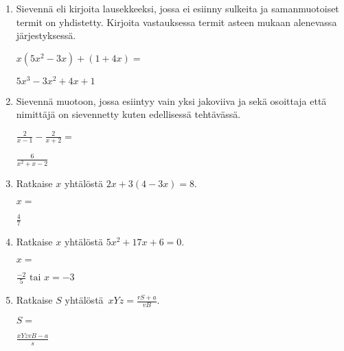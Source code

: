 \documentclass[finnish, a4paper, 12pt]{article}
\begin{document}
\begin{enumerate}[leftmargin=*]
		\vspace{8pt}
		
		\item %
		Sievennä eli kirjoita lausekkeeksi, jossa ei esiinny sulkeita ja 
		samanmuotoiset termit on yhdistetty. 
		Kirjoita vastauksessa termit asteen mukaan alenevassa järjestyksessä. 
		
		\(
		\displaystyle
		x(5x^2 - 3x) + (1 + 4x) = 
		\) %
		\begin{version:withAnswers}
		\( 5x^3 -3x^2 +4x +1 \)
		\end{version:withAnswers}
		
		\vspace{8pt}
		
		\item %
		Sievennä %
		muotoon, jossa esiintyy vain yksi jakoviiva ja sekä osoittaja
		että nimittäjä on sievennetty kuten edellisessä tehtävässä.
		
		\(
		\displaystyle
		\frac{2}{x-1}- \frac{2}{x + 2} =
		\) %
		\begin{version:withAnswers}
		\( \frac{6}{x^2  + x - 2} \)
		\end{version:withAnswers}
		
		\vspace{8pt}
		
		\item %
		Ratkaise \(x\) yhtälöstä \(2x + 3(4 - 3x) = 8\).
		
		\(
		x = 
		\)	%
		\begin{version:withAnswers}
		 \( \frac{4}{7} \)
		\end{version:withAnswers}
		\vspace{8pt}
		
		\item %
		Ratkaise \(x\) yhtälöstä \(5 x^2  + 17 x + 6= 0\).
		
		\(
		x = 		
		\)	%
		
		\begin{version:withAnswers}
		\(\frac{-2}{5} \text{  tai } x = -3\)
		\end{version:withAnswers}
		\vspace{8pt}
		
		\item %
		Ratkaise \(S\) yhtälöstä 
		\(
		\displaystyle \,
		xYz = \frac{rS+a}{vB} .
		\)	
		
		\(
		S = 
		\) %
		\begin{version:withAnswers}
		\( \frac{xYzvB-a}{s}\)
		\end{version:withAnswers}
		
	\end{enumerate}
	
	
\end{document}
